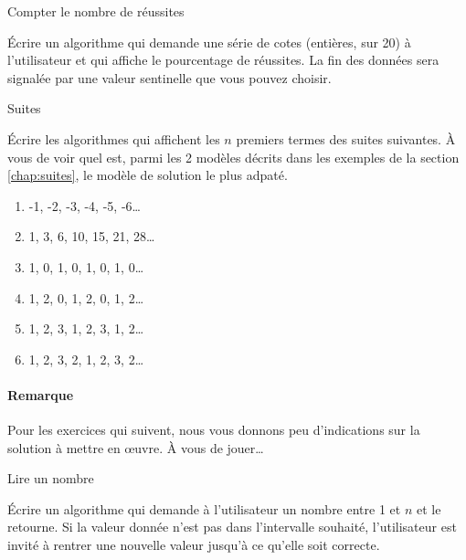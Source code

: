 		\begin{Exercice}{Compter le nombre de réussites}

			Écrire un algorithme qui demande une série
			de cotes (entières, sur 20) à l’utilisateur
			et qui affiche le pourcentage de réussites.
			La fin des données sera signalée 
			par une valeur sentinelle que vous pouvez choisir.
		\end{Exercice}

		\begin{Exercice}{Suites}

			Écrire les algorithmes qui affichent les $n$ premiers termes des
			suites suivantes.  À vous de voir quel est, parmi les 2 modèles
			décrits dans les exemples de la section \vref{chap:suites}, le
			modèle de solution le plus adpaté.

			\begin{enumerate}[label=\alph*)]
				\item -1, -2, -3, -4, -5, -6\dots
				\item 1, 3, 6, 10, 15, 21, 28\dots
				\item 1, 0, 1, 0, 1, 0, 1, 0\dots
				\item 1, 2, 0, 1, 2, 0, 1, 2\dots
				\item 1, 2, 3, 1, 2, 3, 1, 2\dots
				\item 1, 2, 3, 2, 1, 2, 3, 2\dots
			\end{enumerate}			
		\end{Exercice}

\bigskip
\begin{Emphase}

	\paragraph{Remarque}

	Pour les exercices qui suivent, nous vous donnons peu d’indications sur la
	solution à mettre en \oe{}uvre.  À vous de jouer\dots{}

\end{Emphase}
\bigskip

		\begin{Exercice}{Lire un nombre}

			Écrire un algorithme qui demande à l’utilisateur un nombre entre
			1 et $n$ et le retourne.  Si la valeur donnée n’est pas dans
			l’intervalle souhaité, l’utilisateur est invité à rentrer une
			nouvelle valeur jusqu’à ce qu’elle soit correcte.
			
	\end{Exercice}

